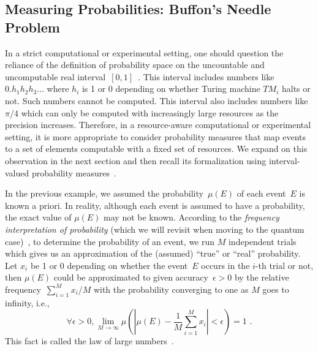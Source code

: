 \documentclass[12pt]{iopart}
\theoremstyle{plain}
\theoremstyle{definition}
\newcommand{\pmeas}{\ensuremath{\mu}}
\begin{document}
\subsection{Measuring Probabilities: Buffon's Needle Problem\label{subsec:Measuring-Probabilities:-Buffon}}

In a strict computational or experimental setting, one should question
the reliance of the definition of probability space on the uncountable
and uncomputable real
interval~$[0,1]$~\cite{Turing_1937,Ziegler2007,weihrauch2012computable}.
This interval includes numbers like $0.h_{1}h_{2}h_{3}\ldots$ where
$h_{i}$ is 1 or 0 depending on whether Turing machine
$\mathit{TM}_{i}$ halts or not. Such numbers cannot be computed. This
interval also includes numbers like $\pi / 4$ which can only be
computed with increasingly large resources as the precision
increases. Therefore, in a resource-aware computational or
experimental setting, it is more appropriate to consider probability
measures that map events to a set of elements computable with a fixed
set of resources. We expand on this observation in the next section
and then recall its formalization using interval-valued probability
measures~\cite{Weichselberger2000,JamisonLodwick2004}.
 
In the previous example, we assumed the probability~$\pmeas(E)$ of
each event~$E$ is known a priori. In reality, although each event is
assumed to have a probability, the exact value of $\pmeas(E)$ may not
be known. According to the \emph{frequency interpretation of
  probability} (which we will revisit when moving to the quantum
case)~\cite{Venn1876,Hajek2012}, 
to determine the probability of an event, we run $M$
independent trials which gives us an approximation of the (assumed)
``true'' or ``real'' probability. Let $x_{i}$ be 1 or 0 depending on
whether the event~$E$ occurs in the $i$-th trial or not, then
$\pmeas(E)$ could be approximated to given accuracy~$\epsilon>0$ by
the relative frequency~$\sum_{i=1}^{M}x_{i} / M$ with the
probability converging to one as $M$ goes to infinity, i.e.,
\begin{equation}
\forall\epsilon>0,\lim_{M\rightarrow\infty}\pmeas\left(\left|\pmeas(E)-\frac{1}{M}\sum_{i=1}^{M} x_{i}\right|<\epsilon\right)=1\textrm{ .}
\end{equation}
This fact is called the law of large numbers~\cite{Bernoulli2006,Kolmogorov1950,Uspensky1937,Shafer1976,544199}.
\end{document}

